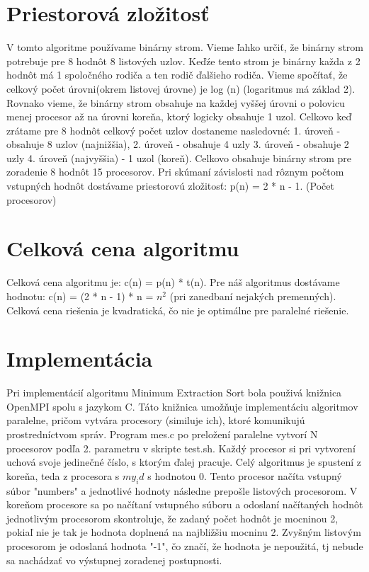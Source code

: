 \documentclass[11pt,a4paper,titlepage,final]{article}
\begin{document}
\section{Priestorová zložitosť}
V tomto algoritme používame binárny strom. Vieme ľahko určiť, že binárny strom potrebuje pre 8 hodnôt 8 listových uzlov. Keďźe tento strom je binárny každa z 2 hodnôt má 1 spoločného rodiča a ten rodič ďalšieho rodiča.
Vieme spočítať, že celkový počet úrovni(okrem listovej úrovne) je log (n) (logaritmus má základ 2). Rovnako vieme, že binárny strom obsahuje na každej vyššej úrovni o polovicu menej procesor až na úrovni koreňa, ktorý logicky obsahuje 1 uzol. Celkovo keď zrátame pre 8 hodnôt celkový počet uzlov dostaneme nasledovné: 1. úroveň - obsahuje 8 uzlov (najnižšia), 2. úroveň - obsahuje 4 uzly 3. úroveň  - obsahuje 2 uzly 4. úroveň (najvyššia) - 1 uzol (koreň). Celkovo obsahuje binárny strom pre zoradenie 8 hodnôt 15 procesorov. Pri skúmaní závislosti nad rôznym počtom vstupných hodnôt dostávame priestorovú zložitosť: p(n) = 2 * n - 1. (Počet procesorov)
\section{Celková cena algoritmu}
Celková cena algoritmu je: c(n) = p(n) * t(n). Pre náš algoritmus dostávame hodnotu: c(n) = (2 * n - 1) * n = $n^2$ (pri zanedbaní nejakých premenných). Celková cena riešenia je kvadratická, čo nie je optimálne pre paralelné riešenie. 

\section{Implementácia}
Pri implementácií algoritmu Minimum Extraction Sort bola použivá knižnica OpenMPI spolu s jazykom C. Táto knižnica umožňuje implementáciu algoritmov paralelne, pričom vytvára procesory (similuje ich), ktoré komunikujú prostredníctvom správ. Program mes.c po preložení paralelne vytvorí N procesorov podľa 2. parametru v skripte test.sh. Každý procesor si pri vytvorení uchová svoje jedinečné číslo, s ktorým ďalej pracuje. Celý algoritmus je spustení z koreňa, teda z procesora s $my_id$ s hodnotou 0. Tento procesor načíta vstupný súbor "numbers" a jednotlivé hodnoty následne prepošle listových procesorom. V koreňom procesore sa po načítaní vstupného súboru a odoslaní načítaných hodnôt jednotlivým procesorom skontroluje, že zadaný počet hodnôt je mocninou 2, pokiaľ nie je tak je hodnota doplnená na najbližšiu mocninu 2. Zvyšným listovým procesorom je odoslaná hodnota "-1", čo značí, že hodnota je nepoužitá, tj nebude sa nachádzať vo výstupnej zoradenej postupnosti. 
\end{document}
